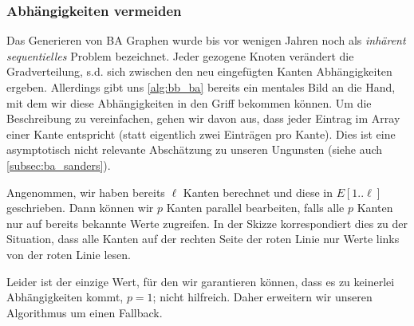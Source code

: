 \subsubsection{Abhängigkeiten vermeiden}
Das Generieren von BA Graphen wurde bis vor wenigen Jahren noch als \emph{inhärent sequentielles} Problem bezeichnet.
Jeder gezogene Knoten verändert die Gradverteilung, s.d. sich zwischen den neu eingefügten Kanten Abhängigkeiten ergeben.
Allerdings gibt uns \cref{alg:bb_ba} bereits ein mentales Bild an die Hand, mit dem wir diese Abhängigkeiten in den Griff bekommen können.
Um die Beschreibung zu vereinfachen, gehen wir davon aus, dass jeder Eintrag im Array einer Kante entspricht (statt eigentlich zwei Einträgen pro Kante).
Dies ist eine asymptotisch nicht relevante Abschätzung zu unseren Ungunsten (siehe auch \cref{subsec:ba_sanders}).

Angenommen, wir haben bereits $\ell$ Kanten berechnet und diese in $E[1..\ell]$ geschrieben.
Dann können wir $p$ Kanten parallel bearbeiten, falls alle $p$ Kanten nur auf bereits bekannte Werte zugreifen.
In der Skizze korrespondiert dies zu der Situation, dass alle Kanten auf der rechten Seite der roten Linie nur Werte links von der roten Linie lesen.

\begin{center}
\end{center}

Leider ist der einzige Wert, für den wir garantieren können, dass es zu keinerlei Abhängigkeiten kommt, $p=1$; nicht hilfreich.
Daher erweitern wir unseren Algorithmus um einen Fallback.


